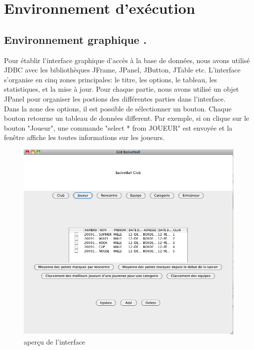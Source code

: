 \documentclass{article}
\begin{document}
\newpage
\section{Environnement d'exécution}
\subsection{Environnement graphique
.}

Pour établir l'interface graphique d'accès à la base de données, nous avons utilisé JDBC avec les bibliothèques JFrame, JPanel, JButton, JTable etc. L'interface s'organise en cinq zones principales: le titre, les options, le tableau, les statistiques, et la mise à jour. Pour chaque partie, nous avons utilisé un objet JPanel pour organiser les postions des différentes parties dans l'interface. \\

Dans la zone des options, il est possible de sélectionner un bouton. Chaque bouton retourne un tableau de données different. Par exemple, si on clique sur le bouton "Joueur", une commande "select * from JOUEUR" est envoyée et la fenêtre affiche les toutes informations sur les joueurs. \\

\begin{figure}[!h]
\centering
\includegraphics[scale = 0.4] {1.png}
\caption{aperçu de l'interface}
\end{figure}
\end{document}
